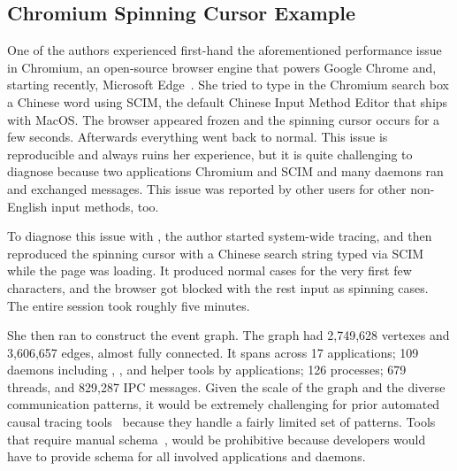 \subsection{Chromium Spinning Cursor Example}


One of the authors experienced first-hand the aforementioned performance issue
in Chromium, an open-source browser engine that powers Google Chrome and,
starting recently, Microsoft Edge~\cite{chromiumurl}.  She tried to type in the
Chromium search box a Chinese word using SCIM, the default Chinese Input Method
Editor that ships with MacOS.  The browser appeared frozen and the spinning
cursor occurs for a few seconds.  Afterwards everything went back to normal.
This issue is reproducible and always ruins her experience, but it is quite
challenging to diagnose because two applications Chromium and SCIM and many
daemons ran and exchanged messages.  This issue was reported by other users for
other non-English input methods, too.

To diagnose this issue with \xxx, the author started system-wide tracing, and
then reproduced the spinning cursor with a Chinese search string typed via SCIM
while the page was loading. It produced normal cases for the very first few
characters, and the browser got blocked with the rest input as spinning cases.
The entire session took roughly five minutes.

She then ran \xxx to construct the event graph.  The graph had 2,749,628
vertexes and 3,606,657 edges, almost fully connected.  It spans across 17
applications; 109 daemons including , , 
and helper tools by applications; 126 processes; 679 threads, and 829,287 IPC
messages.  Given the scale of the graph and the diverse communication patterns,
it would be extremely challenging for prior automated causal tracing
tools~\cite{aguilera2003performance, zhang2013panappticon, attariyan2012x,
cohen2004correlating} because they handle a fairly limited set of patterns.
Tools that require manual schema~\cite{barham2004using, reynolds2006pip}, would
be prohibitive because developers would have to provide schema for all involved
applications and daemons.

